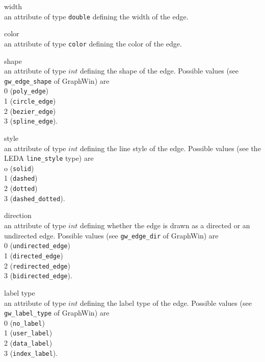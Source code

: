 \begin{description}

\item{width}\\
an attribute of type {\tt double} defining the width of the edge.

\item{color}\\
an attribute of type {\tt color} defining the color of the edge.

\item{shape}\\
an attribute of type $int$ defining the shape of the edge. 
Possible values (see {\tt gw\_edge\_shape} of GraphWin) are\\
0 ({\tt poly\_edge})\\
1 ({\tt circle\_edge})\\
2 ({\tt bezier\_edge})\\
3 ({\tt spline\_edge}).


\item{style}\\
an attribute of type $int$ defining the line style of the edge.
Possible values (see the LEDA {\tt line\_style} type) are\\
o ({\tt solid})\\
1 ({\tt dashed})\\
2 ({\tt dotted})\\
3 ({\tt dashed\_dotted}).

\item{direction}\\
an attribute of type $int$ defining whether the edge is 
drawn as a directed or an undirected edge. 
Possible values (see {\tt gw\_edge\_dir} of GraphWin) are\\
0 ({\tt undirected\_edge})\\
1 ({\tt directed\_edge})\\
2 ({\tt redirected\_edge})\\
3 ({\tt bidirected\_edge}).



\item{label type}\\
an attribute of type $int$ defining the label type of the edge.
Possible values (see {\tt gw\_label\_type}  of GraphWin) are\\
0 ({\tt no\_label})\\
1 ({\tt user\_label})\\
2 ({\tt data\_label})\\
3 ({\tt index\_label}).



\end{description}
